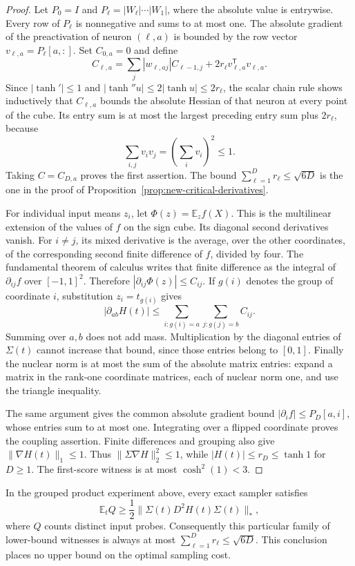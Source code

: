 \begin{proof}
Let $P_0=I$ and $P_\ell=|W_\ell|\cdots|W_1|$, where the
absolute value is entrywise. Every row of $P_\ell$ is nonnegative
and sums to at most one. The absolute gradient of the preactivation
of neuron $(\ell,a)$ is bounded by the row vector
$v_{\ell,a}=P_\ell[a,:]$.
Set $C_{0,a}=0$ and define
\[
 C_{\ell,a}
 =\sum_j|w_{\ell,aj}|C_{\ell-1,j}
       +2r_\ell v_{\ell,a}^{\mathsf T}v_{\ell,a}.
\]
Since $|\tanh'|\le1$ and
$|\tanh''u|\le2|\tanh u|\le2r_\ell$, the scalar chain
rule shows inductively that $C_{\ell,a}$ bounds the absolute
Hessian of that neuron at every point of the cube. Its entry sum is
at most the largest preceding entry sum plus $2r_\ell$, because
\[
 \sum_{i,j}v_i v_j=\left(\sum_i v_i\right)^2\le1.
\]
Taking $C=C_{D,a}$ proves the first assertion. The bound
$\sum_{\ell=1}^Dr_\ell\le\sqrt{6D}$ is the one in the proof of
Proposition~\ref{prop:new-critical-derivatives}.

For individual input means $z_i$, let
$\Phi(z)=\mathbb E_z f(X)$. This is the multilinear extension
of the values of $f$ on the sign cube. Its diagonal second derivatives
vanish. For $i\ne j$, its mixed derivative is the average, over the
other coordinates, of the corresponding second finite difference
of $f$, divided by four. The fundamental theorem of calculus writes
that finite difference as the integral of $\partial_{ij}f$ over
$[-1,1]^2$. Therefore
$|\partial_{ij}\Phi(z)|\le C_{ij}$.
If $g(i)$ denotes the group of coordinate $i$, substitution
$z_i=t_{g(i)}$ gives
\[
 |\partial_{ab}H(t)|
 \le\sum_{i:g(i)=a}\sum_{j:g(j)=b}C_{ij}.
\]
Summing over $a,b$ does not add mass. Multiplication by the diagonal
entries of $\Sigma(t)$ cannot increase that bound, since those entries
belong to $[0,1]$. Finally the nuclear norm is at most the sum of the
absolute matrix entries: expand a matrix in the rank-one coordinate
matrices, each of nuclear norm one, and use the triangle inequality.

The same argument gives the common absolute gradient bound
$|\partial_i f|\le P_D[a,i]$, whose entries sum to at most one.
Integrating over a flipped coordinate proves the coupling assertion.
Finite differences and grouping also give
$\|\nabla H(t)\|_1\le1$. Thus
$\|\Sigma\nabla H\|_2^2\le1$, while
$|H(t)|\le r_D\le\tanh1$ for $D\ge1$. The first-score witness
is at most $\cosh^2(1)<3$.
\end{proof}

\begin{proposition}
\label{prop:critical-matrix-score}
In the grouped product experiment above, every exact sampler satisfies
\[
 \mathbb E_tQ\ge
 \frac12\|\Sigma(t)D^2H(t)\Sigma(t)\|_*,
\]
where $Q$ counts distinct input probes. Consequently this particular
family of lower-bound witnesses is always at most
$\sum_{\ell=1}^D r_\ell\le\sqrt{6D}$.
This conclusion places no upper bound on the optimal sampling cost.
\end{proposition}

